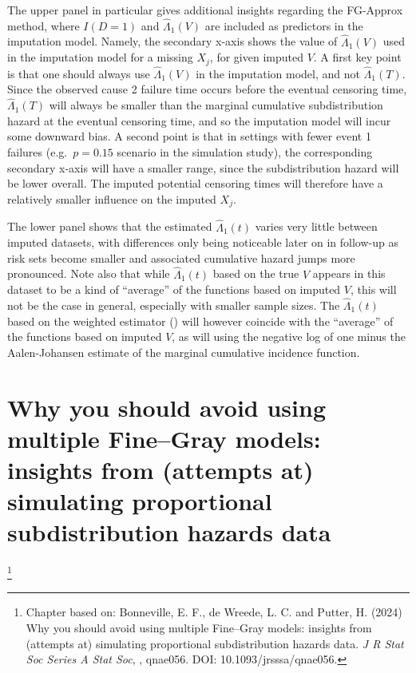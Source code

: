 \documentclass[
  letterpaper,
  paper=240mm:170mm,
  twoside=true,
  open=right,
  fontsize=10pt,
  pagesize=false,
  BCOR=15mm,
  DIV=14,
  headinclude=true,
  footinclude=false,
  headsepline=on]{scrbook}
\newcommand\blfootnote[1]{%
  \begingroup
  \renewcommand\thefootnote{}\footnote{#1}%
  \addtocounter{footnote}{-1}%
  \endgroup
}
\begin{document}
The upper panel in particular gives additional insights regarding the
FG-Approx method, where \(I(D = 1)\) and \(\hat{\Lambda}_1(V)\) are
included as predictors in the imputation model. Namely, the secondary
x-axis shows the value of \(\hat{\Lambda}_1(V)\) used in the imputation
model for a missing \(X_j\), for given imputed \(V\). A first key point
is that one should always use \(\hat{\Lambda}_1(V)\) in the imputation
model, and not \(\hat{\Lambda}_1(T)\). Since the observed cause 2
failure time occurs before the eventual censoring time,
\(\hat{\Lambda}_1(T)\) will always be smaller than the marginal
cumulative subdistribution hazard at the eventual censoring time, and so
the imputation model will incur some downward bias. A second point is
that in settings with fewer event 1 failures (e.g.~\(p = 0.15\) scenario
in the simulation study), the corresponding secondary x-axis will have a
smaller range, since the subdistribution hazard will be lower overall.
The imputed potential censoring times will therefore have a relatively
smaller influence on the imputed \(X_j\).

The lower panel shows that the estimated \(\hat{\Lambda}_1(t)\) varies
very little between imputed datasets, with differences only being
noticeable later on in follow-up as risk sets become smaller and
associated cumulative hazard jumps more pronounced. Note also that while
\(\hat{\Lambda}_1(t)\) based on the true \(V\) appears in this dataset
to be a kind of ``average'' of the functions based on imputed \(V\),
this will not be the case in general, especially with smaller sample
sizes. The \(\hat{\Lambda}_1(t)\) based on the weighted estimator
() will however coincide with the ``average'' of the functions based
on imputed \(V\), as will using the negative log of one minus the
Aalen-Johansen estimate of the marginal cumulative incidence function.


\chapter{Why you should avoid using multiple Fine--Gray models: insights
from (attempts at) simulating proportional subdistribution hazards
data}\label{sec-chap-FG-DGM}


\blfootnote{Chapter based on: Bonneville, E. F., de Wreede, L. C. and Putter, H. (2024) Why you should avoid using multiple Fine–Gray models: insights from (attempts at) simulating proportional subdistribution hazards data. \textit{J R Stat Soc Series A Stat Soc}, , qnae056. DOI: 10.1093/jrsssa/qnae056.}
\end{document}
